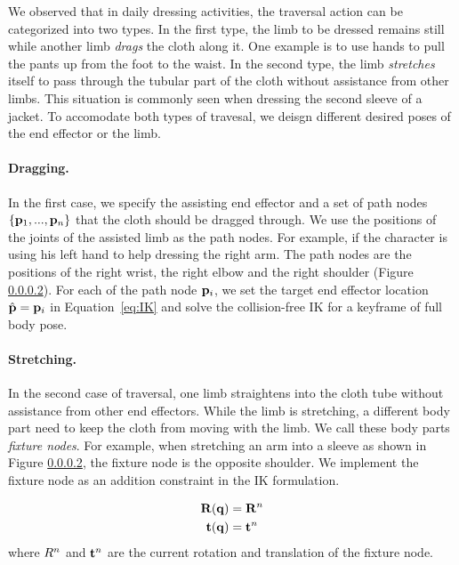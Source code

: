 We observed that in daily dressing activities, the traversal action can be categorized into two types. In the first type, the limb to be dressed remains still while another limb \emph{drags} the cloth along it. One example is to use hands to pull the pants up from the foot to the waist. In the second type, the limb \emph{stretches} itself to pass through the tubular part of the cloth without assistance from other limbs. This situation is commonly seen when dressing the second sleeve of a jacket. To accomodate both types of travesal, we deisgn different desired poses of the end effector or the limb.

\paragraph{Dragging.} In the first case, we specify the assisting end effector and a set of path nodes $\{\mathbf{p}_1 ,..., \mathbf{p}_n\}$ that the cloth should be dragged through. We use the positions of the joints of the assisted limb as the path nodes. For example, if the character is using his left hand to help dressing the right arm. The path nodes are the positions of the right wrist, the right elbow and the right shoulder (Figure \ref{}). For each of the path node $\mathbf{p}_i$, we set the target end effector location $\hat{\mathbf{p}}=\mathbf{p}_i$ in Equation~\ref{eq:IK} and solve the collision-free IK for a keyframe of full body pose. 

\paragraph{Stretching.} In the second case of traversal, one limb straightens into the cloth tube without assistance from other end effectors. While the limb is stretching, a different body part need to keep the cloth from moving with the limb. We call these body parts \emph{fixture nodes}. For example, when stretching an arm into a sleeve as shown in Figure \ref{}, the fixture node is the opposite shoulder. We implement the fixture node as an addition constraint in the IK formulation.

\begin{align}
  \label{eq:fixtureNode}
  \mathbf{R}(\mathbf{q})& = \mathbf{R}^n\\
  \nonumber  \mathbf{t}(\mathbf{q})& = \mathbf{t}^n
\end{align}
where $\mathbf{}R^n$ and $\mathbf{t}^n$ are the current rotation and translation of the fixture node.


